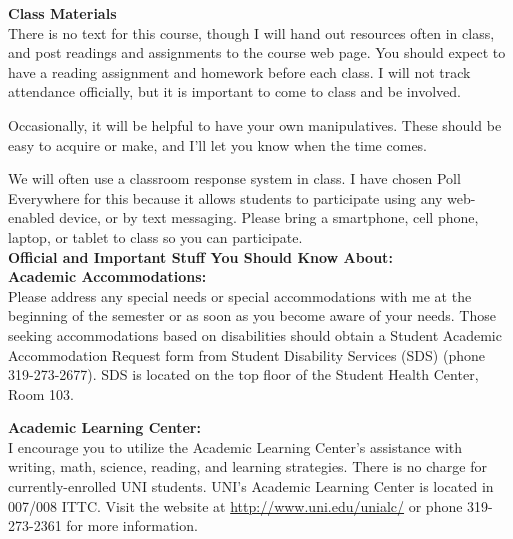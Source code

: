 \documentclass[12pt]{amsart}
\begin{document}
\noindent
\textbf{Class Materials}\\
There is no text for this course, though I will hand out resources often in class, and post readings and assignments to the course web page. You should expect to have a reading assignment and homework before each class. I will not track attendance officially, but it is important to come to class and be involved.

Occasionally, it will be helpful to have your own manipulatives. These should be easy to acquire or make, and I’ll let you know when the time comes.

We will often use a classroom response system in class. I have chosen Poll Everywhere for this because it allows students to participate using any web-enabled device, or by text messaging. Please bring a smartphone, cell phone, laptop, or tablet to class so you can participate.\\

\noindent
\textbf{Official and Important Stuff You Should Know About:}\\

\noindent
\textbf{Academic Accommodations:}\\
Please address any special needs or special accommodations with me at the beginning of the semester or as soon as you become aware of your needs. Those seeking accommodations based on disabilities should obtain a Student Academic Accommodation Request form from Student Disability Services (SDS) (phone 319-273-2677). SDS is located on the top floor of the Student Health Center, Room 103.

\noindent
\textbf{Academic Learning Center:}\\
I encourage you to utilize the Academic Learning Center’s assistance with writing, math, science, reading, and learning strategies. There is no charge for currently-enrolled UNI students. UNI’s Academic Learning Center is located in 007/008 ITTC. Visit the website at \url{http://www.uni.edu/unialc/} or phone 319-273-2361 for more information.
\end{document}
